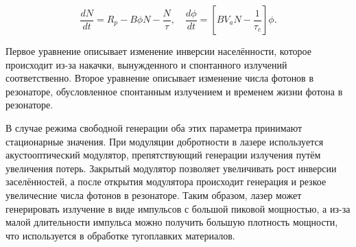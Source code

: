 \documentclass[a4paper, 12pt]{article}
\begin{document}
\begin{equation}
\dfrac{dN}{dt} = R_p - B\phi N - \dfrac{N}{\tau},\quad
\dfrac{d\phi}{dt} = \left[BV_aN - \dfrac{1}{\tau_c}\right]\phi.
\label{eq_speed2}
\end{equation}
\par
Первое уравнение описывает изменение инверсии населённости, которое происходит из-за накачки, вынужденного и спонтанного излучений соответственно. Второе уравнение описывает изменение числа фотонов в резонаторе, обусловленное спонтанным излучением и временем жизни фотона в резонаторе.\par
В случае режима свободной генерации оба этих параметра принимают стационарные значения.
При модуляции добротности в лазере используется акустооптический модулятор, препятствующий генерации излучения путём увеличения потерь. Закрытый модулятор позволяет увеличивать рост инверсии заселённостей, а после открытия модулятора происходит генерация и резкое увеличесние числа фотонов в резонаторе. Таким образом, лазер может генерировать излучение в виде импульсов с большой пиковой мощностью, а из-за малой длительности импульса можно получить большую плотность мощности, что используется в обработке тугоплавких материалов.
\end{document}
